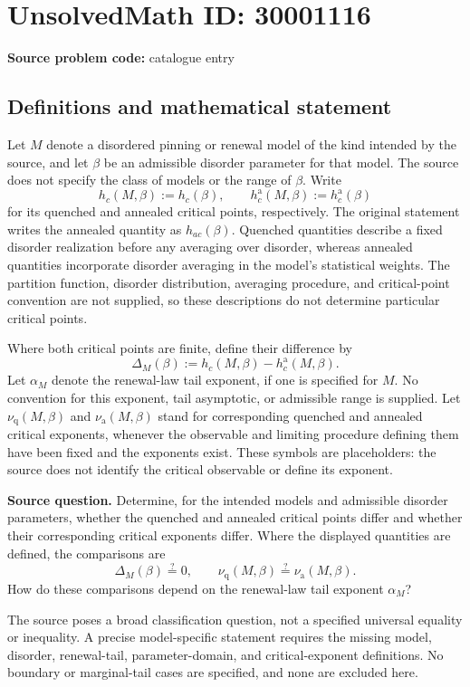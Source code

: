 \documentclass[11pt]{article}
\begin{document}
\section*{UnsolvedMath ID: 30001116}
\textbf{Source problem code:} catalogue entry
\subsection{Definitions and mathematical statement}
Let \(M\) denote a disordered pinning or renewal model of the kind intended by the source, and let \(\beta\) be an admissible disorder parameter for that model. The source does not specify the class of models or the range of \(\beta\). Write
\[
 h_c(M,\beta):=h_c(\beta),\qquad
 h_c^{\mathrm a}(M,\beta):=h_c^{\mathrm a}(\beta)
\]
for its quenched and annealed critical points, respectively. The original statement writes the annealed quantity as \(h_{ac}(\beta)\). Quenched quantities describe a fixed disorder realization before any averaging over disorder, whereas annealed quantities incorporate disorder averaging in the model's statistical weights. The partition function, disorder distribution, averaging procedure, and critical-point convention are not supplied, so these descriptions do not determine particular critical points.

Where both critical points are finite, define their difference by
\[
 \Delta_M(\beta):=h_c(M,\beta)-h_c^{\mathrm a}(M,\beta).
\]
Let \(\alpha_M\) denote the renewal-law tail exponent, if one is specified for \(M\). No convention for this exponent, tail asymptotic, or admissible range is supplied. Let \(\nu_{\mathrm q}(M,\beta)\) and \(\nu_{\mathrm a}(M,\beta)\) stand for corresponding quenched and annealed critical exponents, whenever the observable and limiting procedure defining them have been fixed and the exponents exist. These symbols are placeholders: the source does not identify the critical observable or define its exponent.

\textbf{Source question.} Determine, for the intended models and admissible disorder parameters, whether the quenched and annealed critical points differ and whether their corresponding critical exponents differ. Where the displayed quantities are defined, the comparisons are
\[
 \Delta_M(\beta)\stackrel{?}{=}0,
 \qquad
 \nu_{\mathrm q}(M,\beta)\stackrel{?}{=}
 \nu_{\mathrm a}(M,\beta).
\]
How do these comparisons depend on the renewal-law tail exponent \(\alpha_M\)?

The source poses a broad classification question, not a specified universal equality or inequality. A precise model-specific statement requires the missing model, disorder, renewal-tail, parameter-domain, and critical-exponent definitions. No boundary or marginal-tail cases are specified, and none are excluded here.
\end{document}
